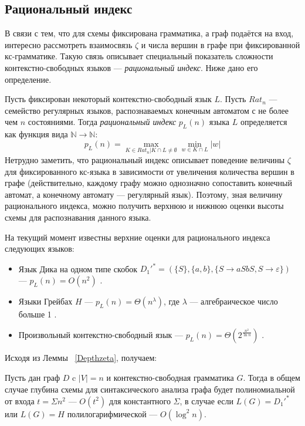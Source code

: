 \documentclass{spbau-diploma}
\begin{document}
\subsection{Рациональный индекс}
В связи с тем, что для схемы фиксирована грамматика, а граф подаётся на вход, интересно рассмотреть взаимосвязь $\zeta$ и числа вершин в графе при фиксированной кс-грамматике. 
Такую связь описывает специальный показатель сложности контекстно-свободных языков --- \textit{рациональный индекс}. Ниже дано его определение.
\par
Пусть фиксирован некоторый контекстно-свободный язык $L$. Пусть $Rat_n$ --- семейство регулярных языков, распознаваемых конечным автоматом с  не более чем $n$ состояниями.  Тогда \textit{рациональный индекс} $p_L(n)$ языка $L$ определяется как функция вида $\mathbb{N} \rightarrow \mathbb{N}$:
\begin{equation}
p_L(n) = \max\limits_{K \in Rat_n | K  \cap L \neq \emptyset} \min\limits_{w \in K  \cap L } |w|
\end{equation}
Нетрудно заметить, что рациональный индекс описывает поведение величины  $\zeta$ для фиксированного кс-языка в зависимости от увеличения количества вершин в графе (действительно, каждому графу можно однозначно сопоставить конечный автомат, а конечному автомату --- регулярный язык).  Поэтому, зная величину рационального индекса, можно получить верхнюю и нижнюю оценки высоты схемы для распознавания данного языка.
\par
На текущий момент известны верхние оценки для рационального индекса следующих языков:
\begin{itemize}
	\item Язык Дика  на одном типе скобок $D_1'^* = (\{S\}, \{a, b\}, \{S \rightarrow aSbS, S \rightarrow \varepsilon\})$ --- $p_L(n) = O(n^2)$ \cite{Dyck1}.
	\item Языки Грейбах $H$ --- $p_L(n) = \Theta(n^\lambda)$, где  $\lambda$ --- алгебраическое число больше 1 \cite{GreibRat}.
	\item Произвольный контекстно-свободный язык --- $p_L(n) = \Theta(2^ {\frac{n^2}{\ln n}})$ \cite{CFRat}.
\end{itemize}
Исходя из Леммы ~\ref{Depthzeta}, получаем:
\begin{corollaryrus} Пусть дан граф $D$ c $|V|=n$ и контекстно-свободная грамматика $G$. Тогда в общем случае глубина схемы для синтаксического анализа графа будет полиномиальной от входа $t = \Sigma n^2$ --- $O(t^2)$ для константного $\Sigma$, в случае если $L(G) = D_1'^*$ или $L(G) = H$ полилогарифмической  --- $O(\log^2 n)$. 
\end{corollaryrus}
\end{document}

